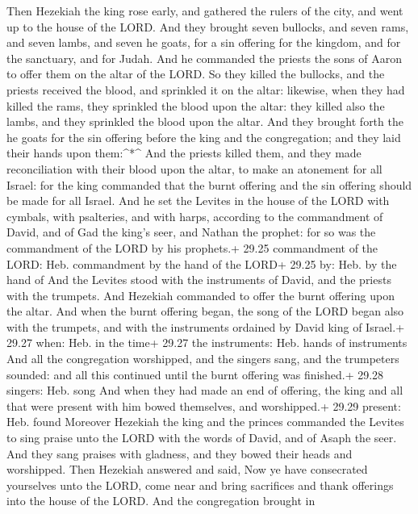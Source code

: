  Then Hezekiah the king rose early, and gathered the rulers
of the city, and went up to the house of the LORD.  And
they brought seven bullocks, and seven rams, and seven lambs, and seven
he goats, for a sin offering for the kingdom, and for the sanctuary, and
for Judah. And he commanded the priests the sons of Aaron to offer them
on the altar of the LORD.  So they killed the bullocks, and
the priests received the blood, and sprinkled it on the altar: likewise,
when they had killed the rams, they sprinkled the blood upon the altar:
they killed also the lambs, and they sprinkled the blood upon the altar.
 And they brought forth the he goats for the sin offering
before the king and the congregation; and they laid their hands upon
them:\^{}*\^{}  And the priests killed them, and they made
reconciliation with their blood upon the altar, to make an atonement for
all Israel: for the king commanded that the burnt offering and the sin
offering should be made for all Israel.  And he set the
Levites in the house of the LORD with cymbals, with psalteries, and with
harps, according to the commandment of David, and of Gad the king's
seer, and Nathan the prophet: for so was the commandment of the LORD by
his prophets.+ 29.25 commandment of the LORD: Heb. commandment by the
hand of the LORD+ 29.25 by: Heb. by the hand of  And the
Levites stood with the instruments of David, and the priests with the
trumpets.  And Hezekiah commanded to offer the burnt
offering upon the altar. And when the burnt offering began, the song of
the LORD began also with the trumpets, and with the instruments ordained
by David king of Israel.+ 29.27 when: Heb. in the time+ 29.27 the
instruments: Heb. hands of instruments  And all the
congregation worshipped, and the singers sang, and the trumpeters
sounded: and all this continued until the burnt offering was finished.+
29.28 singers: Heb. song  And when they had made an end of
offering, the king and all that were present with him bowed themselves,
and worshipped.+ 29.29 present: Heb. found  Moreover
Hezekiah the king and the princes commanded the Levites to sing praise
unto the LORD with the words of David, and of Asaph the seer. And they
sang praises with gladness, and they bowed their heads and worshipped.
 Then Hezekiah answered and said, Now ye have consecrated
yourselves unto the LORD, come near and bring sacrifices and thank
offerings into the house of the LORD. And the congregation brought in
